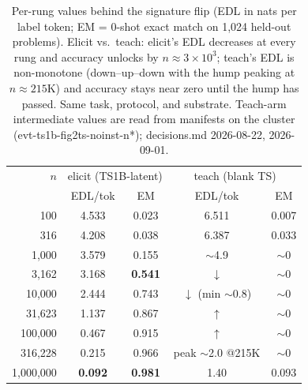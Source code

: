 \begin{table}[t]
\centering
\begin{tabular}{rcccc}
\hline
$n$ & \multicolumn{2}{c}{elicit (TS1B-latent)} & \multicolumn{2}{c}{teach (blank TS)} \\
 & EDL/tok & EM & EDL/tok & EM \\
\hline
100 & 4.533 & 0.023 & 6.511 & 0.007 \\
316 & 4.208 & 0.038 & 6.387 & 0.033 \\
1{,}000 & 3.579 & 0.155 & $\sim$4.9 & $\sim$0 \\
3{,}162 & 3.168 & \textbf{0.541} & $\downarrow$ & $\sim$0 \\
10{,}000 & 2.444 & 0.743 & $\downarrow$ (min $\sim$0.8) & $\sim$0 \\
31{,}623 & 1.137 & 0.867 & $\uparrow$ & $\sim$0 \\
100{,}000 & 0.467 & 0.915 & $\uparrow$ & $\sim$0 \\
316{,}228 & 0.215 & 0.966 & peak $\sim$2.0 @215K & $\sim$0 \\
1{,}000{,}000 & \textbf{0.092} & \textbf{0.981} & 1.40 & 0.093 \\
\hline
\end{tabular}
\caption{Per-rung values behind the signature flip (EDL in nats per label token; EM = 0-shot exact match on 1,024 held-out problems). Elicit vs.\ teach: elicit's EDL decreases at every rung and accuracy unlocks by $n\approx3\times10^3$; teach's EDL is non-monotone (down--up--down with the hump peaking at $n\approx215$K) and accuracy stays near zero until the hump has passed. Same task, protocol, and substrate. Teach-arm intermediate values are read from manifests on the cluster (evt-ts1b-fig2ts-noinst-n*); decisions.md 2026-08-22, 2026-09-01.}
\label{tab:same_base_sweep}
\end{table}
